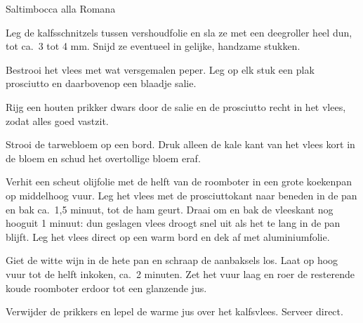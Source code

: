 \begin{recipe}{Saltimbocca alla Romana}
\begin{steps}
  \item Leg de kalfsschnitzels tussen vershoudfolie en sla ze met een
        deegroller heel dun, tot ca.\ 3 tot 4 mm. Snijd ze eventueel in
        gelijke, handzame stukken.
  \item Bestrooi het vlees met wat versgemalen peper. Leg op elk stuk een
        plak prosciutto en daarbovenop een blaadje salie.
  \item Rijg een houten prikker dwars door de salie en de prosciutto recht
        in het vlees, zodat alles goed vastzit.
  \item Strooi de tarwebloem op een bord. Druk alleen de kale kant van het
        vlees kort in de bloem en schud het overtollige bloem eraf.
  \item Verhit een scheut olijfolie met de helft van de roomboter in een
        grote koekenpan op middelhoog vuur. Leg het vlees met de
        prosciuttokant naar beneden in de pan en bak ca.\ 1,5 minuut, tot de
        ham geurt. Draai om en bak de vleeskant nog hooguit 1 minuut: dun
        geslagen vlees droogt snel uit als het te lang in de pan blijft. Leg
        het vlees direct op een warm bord en dek af met aluminiumfolie.
  \item Giet de witte wijn in de hete pan en schraap de aanbaksels los. Laat
        op hoog vuur tot de helft inkoken, ca.\ 2 minuten. Zet het vuur laag
        en roer de resterende koude roomboter erdoor tot een glanzende jus.
  \item Verwijder de prikkers en lepel de warme jus over het kalfsvlees.
        Serveer direct.
\end{steps}

\end{recipe}
